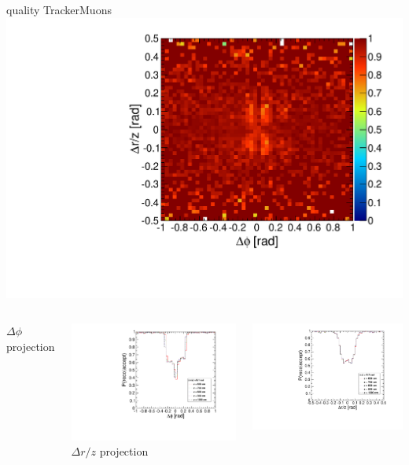 \documentclass[compress]{beamer}
\begin{document}
\begin{frame}
\begin{columns}
\centering quality TrackerMuons
\includegraphics[width=\linewidth]{endcap_dphidr_TrackerMuon.pdf}
\end{columns}

\begin{columns}
\centering $\Delta\phi$ projection

\includegraphics[width=\linewidth]{endcap_dphi_StandAloneMuon.pdf}
\centering $\Delta r/z$ projection

\includegraphics[width=\linewidth]{endcap_dr_StandAloneMuon.pdf}


\end{columns}
\end{frame}
\end{document}
